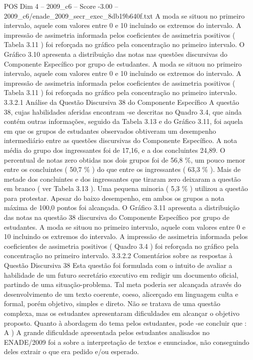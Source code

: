 \begin{textsample}{POS Dim 4 – 2009\_c6 – Score -3.00 – 2009\_c6/enade\_2009\_secr\_exec\_8db19b640f.txt}
A moda se situou no primeiro intervalo, aquele com valores entre 0 e 10 incluindo os extremos do intervalo.
A impressão de assimetria informada pelos coeficientes de assimetria positivos ( Tabela 3.11 ) foi reforçada no gráfico pela concentração no primeiro intervalo.
O Gráfico 3.10 apresenta a distribuição das notas nas questões discursivas do Componente Específico por grupo de estudantes.
A moda se situou no primeiro intervalo, aquele com valores entre 0 e 10 incluindo os extremos do intervalo.
A impressão de assimetria informada pelos coeficientes de assimetria positivos ( Tabela 3.11 ) foi reforçada no gráfico pela concentração no primeiro intervalo. 3.3.2.1 Análise da Questão Discursiva 38 do Componente Específico A questão 38, cujas habilidades aferidas encontram -se descritas no Quadro 3.4, que ainda contém outras informações, seguido da Tabela 3.13 e do Gráfico 3.11, foi aquela em que os grupos de estudantes observados obtiveram um desempenho intermediário entre as questões discursivas do Componente Específico.
A nota média do grupo dos ingressantes foi de 17,16, e a dos concluintes 24,89.
O percentual de notas zero obtidas nos dois grupos foi de 56,8 \%, um pouco menor entre os concluintes ( 50,7 \% ) do que entre os ingressantes ( 63,3 \% ).
Mais de metade dos concluintes e dos ingressantes que tiraram zero deixaram a questão em branco ( ver Tabela 3.13 ).
Uma pequena minoria ( 5,3 \% ) utilizou a questão para protestar.
Apesar do baixo desempenho, em ambos os grupos a nota máxima de 100,0 pontos foi alcançada.
O Gráfico 3.11 apresenta a distribuição das notas na questão 38 discursiva do Componente Específico por grupo de estudantes.
A moda se situou no primeiro intervalo, aquele com valores entre 0 e 10 incluindo os extremos do intervalo.
A impressão de assimetria informada pelos coeficientes de assimetria positivos ( Quadro 3.4 ) foi reforçada no gráfico pela concentração no primeiro intervalo. 3.3.2.2 Comentários sobre as respostas à Questão Discursiva 38 Esta questão foi formulada com o intuito de avaliar a habilidade de um futuro secretário executivo em redigir um documento oficial, partindo de uma situação-problema.
Tal meta poderia ser alcançada através do desenvolvimento de um texto coerente, coeso, alicerçado em linguagem culta e formal, porém objetivo, simples e direto.
Não se tratava de uma questão complexa, mas os estudantes apresentaram dificuldades em alcançar o objetivo proposto.
Quanto à abordagem do tema pelos estudantes, pode -se concluir que : A ) A grande dificuldade apresentada pelos estudantes analisados no ENADE/2009 foi a sobre a interpretação de textos e enunciados, não conseguindo deles extrair o que era pedido e/ou esperado.

\end{textsample}
